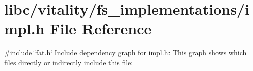 \hypertarget{a00155}{}\section{libc/vitality/fs\+\_\+implementations/impl.h File Reference}
\label{a00155}
{\ttfamily \#include \char`\"{}fat.\+h\char`\"{}}\newline
Include dependency graph for impl.\+h\+:
This graph shows which files directly or indirectly include this file\+:
